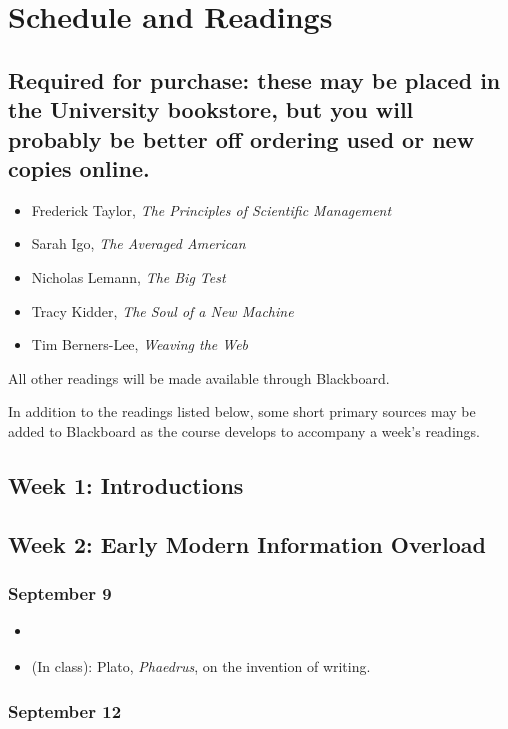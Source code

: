 \section{Schedule and Readings}

\subsection{Required for purchase: these may be placed in the University
bookstore, but you will probably be better off ordering used or new
copies online.}

\begin{itemize}
\item
  Frederick Taylor, \emph{The Principles of Scientific Management}
\item
  Sarah Igo, \emph{The Averaged American}
\item
  Nicholas Lemann, \emph{The Big Test}
\item
  Tracy Kidder, \emph{The Soul of a New Machine}
\item
  Tim Berners-Lee, \emph{Weaving the Web}
\end{itemize}

All other readings will be made available through Blackboard.

In addition to the readings listed below, some short primary sources may
be added to Blackboard as the course develops to accompany a week's
readings.

\subsection{Week 1: Introductions}

\subsection{Week 2: Early Modern Information Overload}

\subsubsection{September 9}

\begin{itemize}
\item
  \cite{blair_reading_2003}
\item
  (In class): Plato, \emph{Phaedrus}, on the invention of writing.
\end{itemize}

\subsubsection{September 12}

